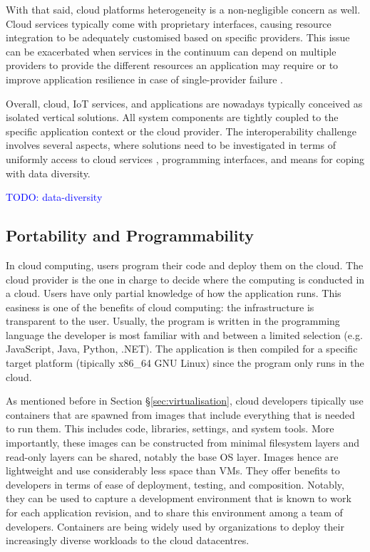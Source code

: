 With that said, cloud platforms heterogeneity is a non-negligible concern as well. Cloud services typically come with proprietary interfaces, causing resource integration to be adequately customised based on specific providers. This issue can be exacerbated when services in the continuum can depend on multiple providers to provide the different resources an application may require or to improve application resilience in case of single-provider failure \cite{inter-cloud}.

Overall, cloud, IoT services, and applications are nowadays typically conceived as isolated vertical solutions. All system components are tightly coupled to the specific application context or the cloud provider. The interoperability challenge involves several aspects, where solutions need to be investigated in terms of uniformly access to cloud services \cite{inter-cloud}, programming interfaces, and means for coping with data diversity.

\textcolor{blue}{TODO: data-diversity}

\subsection{Portability and Programmability}

In cloud computing, users program their code and deploy them on the cloud. The cloud provider is the one in charge to decide where the computing is conducted in a cloud. Users have only partial knowledge of how the application runs. This easiness is one of the benefits of cloud computing: the infrastructure is transparent to the user. Usually, the program is written in the programming language the developer is most familiar with and between a limited selection (e.g. JavaScript, Java, Python, .NET). The application is then compiled for a specific target platform (tipically x86\_64 GNU Linux) since the program only runs in the cloud.

As mentioned before in Section §\ref{sec:virtualisation}, cloud developers tipically use containers that are spawned from images that include everything that is needed to run them. This includes code, libraries, settings, and system tools. More importantly, these images can be constructed from minimal filesystem layers and read-only layers can be shared, notably the base OS layer. Images hence are lightweight and use considerably less space than VMs. They offer benefits to developers in terms of ease of deployment, testing, and composition. Notably, they can be used to capture a development environment that is known to work for each application revision, and to share this environment among a team of developers. Containers are being widely used by organizations to deploy their increasingly diverse workloads to the cloud datacentres.

